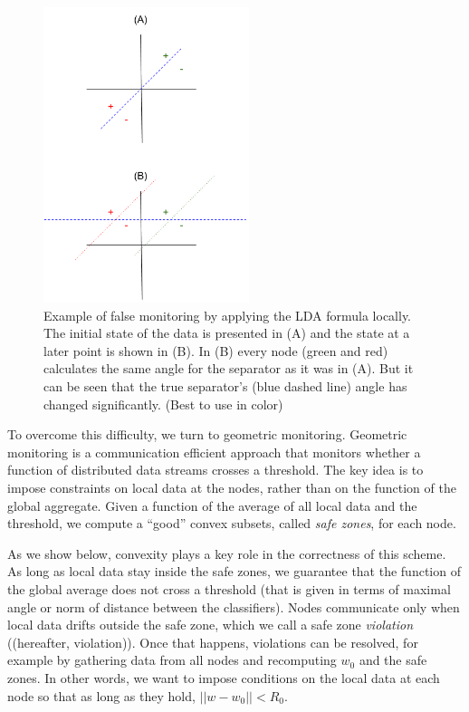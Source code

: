 \documentclass{sig-alternate-05-2015}
\begin{document}
\begin{figure}[h]
\centering
\includegraphics[width=60mm]{NegativeExample.png}
\caption{Example of false monitoring by applying the LDA formula locally. The
initial state of the data is presented in (A) and the state at a later point
is shown in (B). In (B) every node (green and red) calculates the same angle
for the separator as it was in (A). But it can be
seen that the true separator's (blue dashed line) angle has changed
significantly. (Best to use in color)}
\label{NegativeExampl}
\end{figure}


\par To overcome this difficulty, we turn to geometric monitoring. Geometric
monitoring \cite{keren2014geometric, keren2012shape} is a communication
efficient approach that monitors whether a function of distributed
data streams crosses a threshold. The key idea is to
impose constraints on local data at the nodes, rather than
on the function of the global aggregate. Given a function of
the average of all local data and the threshold, we compute a
``good'' convex subsets, called \textit{safe zones}, for each
node.

\par As we show below, convexity
plays a key role in the correctness of this scheme. As long
as local data stay inside the safe zones, we guarantee that
the function of the global average does not cross a threshold (that is given
in terms of maximal angle or norm of distance between the classifiers).
Nodes communicate only when local data drifts outside the
safe zone, which we call a safe zone \textit{violation} ((hereafter,
violation)). Once that happens, violations can be resolved, for example by gathering
data from all nodes and recomputing $w_0$ and the safe zones.
In other words, we want to impose conditions on the local
data at each node so that as long as they hold, $||w-w_0||<R_0$.
\end{document}
